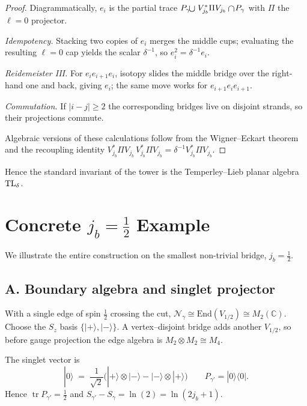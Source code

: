 \documentclass[11pt]{article}
\begin{document}
\begin{proof}
Diagrammatically, $e_i$ is the partial trace
\(
  \smash{P_\gamma\!\mathbin{\raisebox{-0.3ex}{\scalebox{1.2}{$\cup$}}}}
  \;V_{j_b}^{*}\Pi V_{j_b}
  \mathbin{\raisebox{-0.3ex}{\scalebox{1.2}{$\cap$}}}\!P_\gamma
\)
with $\Pi$ the $\ell=0$ projector.  

\emph{Idempotency.}  
Stacking two copies of $e_i$ merges the middle cups; 
evaluating the resulting $\ell=0$ cap yields the scalar $\delta^{-1}$, 
so $e_i^2=\delta^{-1}e_i$.

\emph{Reidemeister III.}  
For $e_ie_{i+1}e_i$, isotopy slides the middle bridge over the right‐hand one
and back, giving $e_i$; the same move works for $e_{i+1}e_ie_{i+1}$.

\emph{Commutation.}  
If $|i-j|\ge2$ the corresponding bridges live on disjoint strands, so their
projections commute.

Algebraic versions of these calculations follow from the 
Wigner--Eckart theorem and the recoupling identity 
$V_{j_b}^{*}\Pi V_{j_b}\,V_{j_b}^{*}\Pi V_{j_b}= \delta^{-1} V_{j_b}^{*}\Pi V_{j_b}$.
\end{proof}

Hence the standard invariant of the tower is the Temperley--Lieb
planar algebra ${\rm TL}_\delta$.

\appendix
\section{Concrete $j_b=\tfrac12$ Example}\label{app:example}

We illustrate the entire construction on the smallest non-trivial bridge,
$j_b=\tfrac12$.

\subsection*{A. Boundary algebra and singlet projector}

With a single edge of spin $\tfrac12$ crossing the cut,
$\mathcal N_{\gamma}\cong\mathrm{End}(V_{1/2})\cong M_2(\mathbb C)$.
Choose the $S_z$ basis $\{|+\rangle,|-\rangle\}$.
A vertex–disjoint bridge adds another $V_{1/2}$, so before gauge
projection the edge algebra is $M_2\!\otimes\!M_2\cong M_4$.

The singlet vector is
\[
  |0\rangle \;=\;
  \frac{1}{\sqrt2}\bigl(|+\rangle\!\otimes|-\rangle-
                        |-\rangle\!\otimes|+\rangle\bigr)
\qquad
  P_{\gamma'} = |0\rangle\langle 0|.
\]
Hence $\operatorname{tr}P_{\gamma'}=\tfrac12$ and
$S_{\gamma'}-S_{\gamma}= \ln(2)=\ln(2j_b+1)$.
\end{document}
